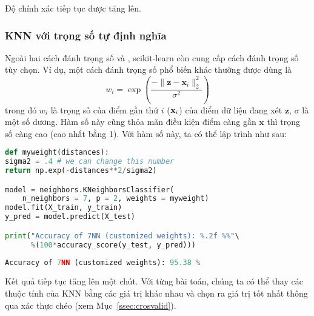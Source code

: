 Độ chính xác tiếp tục được tăng lên.

\subsubsection{KNN với trọng số tự định nghĩa}
Ngoài hai cách đánh trọng số  và , scikit-learn còn cung
cấp cách đánh trọng số tùy chọn. Ví dụ, một cách
đánh trọng số phổ biến khác thường được dùng là
\begin{equation*}
w_i = \exp \left( \frac{-\|\mathbf{z} - \mathbf{x}_i\|_2^2}{\sigma^2}
\right)
\end{equation*}
trong đó $w_i$ là trọng số của điểm gần thứ $i$ ($\mathbf{x}_i$) của điểm dữ liệu
đang xét $\mathbf{z}$, $\sigma$ là một số dương. Hàm số này cũng
thỏa mãn
điều kiện điểm càng gần $\mathbf{x}$ thì trọng số càng cao (cao nhất bằng 1).
Với hàm số này, ta có thể lập trình như sau:


\begin{lstlisting}[language=Python]
def myweight(distances):
sigma2 = .4 # we can change this number
return np.exp(-distances**2/sigma2)

model = neighbors.KNeighborsClassifier(
    n_neighbors = 7, p = 2, weights = myweight)
model.fit(X_train, y_train)
y_pred = model.predict(X_test)

print("Accuracy of 7NN (customized weights): %.2f %%"\
      %(100*accuracy_score(y_test, y_pred)))
\end{lstlisting}
\kq
\begin{lstlisting}[language=Python]
Accuracy of 7NN (customized weights): 95.38 %
\end{lstlisting}

Kết quả tiếp tục tăng lên một chút. Với từng bài toán, chúng ta có thể
thay các thuộc tính của KNN bằng các giá trị khác nhau và chọn ra giá trị tốt
nhất thông qua xác thực chéo (xem Mục~\ref{ssec:crosvalid}).




